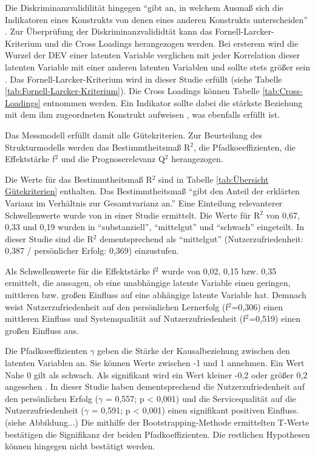 Die Diskriminanzvalidilität hingegen "`gibt an, in welchem Ausmaß sich die Indikatoren eines Konstrukts von denen eines anderen Konstrukts unterscheiden"' \parencite[S.26]{nitzl2010anwenderorientierte}. Zur Überprüfung der Diskriminanzvalididtät kann das Fornell-Larcker-Kriterium und die Cross Loadings herangezogen werden. 
Bei ersterem wird die Wurzel der DEV einer latenten Variable verglichen mit jeder Korrelation dieser latenten Variable mit einer anderen latenten Variablen und sollte stets größer sein \parencite[vgl.][S.26]{nitzl2010anwenderorientierte}. Das Fornell-Larcker-Kriterium wird in dieser Studie erfüllt (siehe Tabelle \ref{tab:Fornell-Larcker-Kriterium}). Die Cross Loadings können Tabelle \ref{tab:Cross-Loadings} entnommen werden. Ein Indikator sollte dabei die stärkste Beziehung mit dem ihm zugeordneten Konstrukt aufweisen \parencite[vgl.][S.26]{nitzl2010anwenderorientierte}, was ebenfalls erfüllt ist.   \nocite{fornell1981evaluating}

Das Messmodell erfüllt damit alle Gütekriterien. Zur Beurteilung des Strukturmodells werden das Bestimmtheitsmaß R$^2$, die Pfadkoeeffizienten, die Effektstärke f$^2$ und die Prognoserelevanz Q$^2$ herangezogen.  

Die Werte für das Bestimmtheitsmaß R$^2$ sind in Tabelle \ref{tab:Übersicht Gütekriterien} enthalten. Das Bestimmtheitsmaß "`gibt den Anteil der erklärten Varianz im Verhältnis zur Gesamtvarianz an."' \parencite[S.32]{nitzl2010anwenderorientierte} Eine Einteilung relevanterer Schwellenwerte wurde von \cite[S.323]{chin1998partial} in einer Studie ermittelt. Die Werte für R$^2$ von 0,67, 0,33 und 0,19 wurden in "`substanziell"', "`mittelgut"' und "`schwach"' eingeteilt. In dieser Studie sind die R$^2$ dementsprechend als "`mittelgut"' (Nutzerzufriedenheit: 0,387 / persönlicher Erfolg: 0,369) einzustufen.

Als Schwellenwerte für die Effektstärke f$^2$ wurde von \cite[S.316f.]{chin1998partial} 0,02, 0,15 bzw. 0,35 ermittelt, die aussagen, ob eine unabhängige latente Variable einen geringen, mittleren bzw. großen Einfluss auf eine abhängige latente Variable hat. Demnach weist Nutzerzufriedenheit auf den persönlichen Lernerfolg (f$^2$=0,306) einen mittleren Einfluss und Systemqualität auf Nutzerzufriedenheit (f$^2$=0,519) einen großen Einfluss aus. 

Die Pfadkoeeffizienten $\gamma$ geben die Stärke der Kausalbeziehung zwischen den latenten Variablen an. Sie können Werte zwischen -1 und 1 annehmen. Ein Wert Nahe 0 gilt als schwach. Als signifikant wird ein Wert kleiner -0,2 oder größer 0,2 angesehen \parencite[vgl.][S.11]{chin1998commentary}. In dieser Studie haben dementsprechend die Nutzerzufriedenheit auf den persönlichen Erfolg ($\gamma$ = 0,557; p < 0,001) und die Servicequalität auf die Nutzerzufriedenheit ($\gamma$ = 0,591; p < 0,001) einen signifikant positiven Einfluss. (siehe Abbildung...) Die mithilfe der Bootstrapping-Methode ermittelten T-Werte bestätigen die Signifikanz der beiden Pfadkoeffizienten. Die restlichen Hypothesen können hingegen nicht bestätigt werden. 

